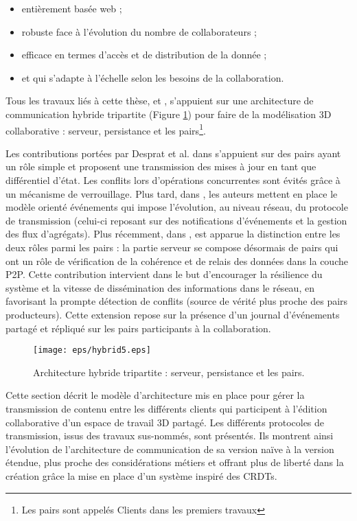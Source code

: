 \begin{itemize}
	\item entièrement basée web ; 
	\item robuste face à l'évolution du nombre de collaborateurs ; 
	\item efficace en termes d'accès et de distribution de la donnée ; 
	\item et qui s'adapte à l'échelle selon les besoins de la collaboration.
\end{itemize}


Tous les travaux liés à cette thèse, 
\cite{Desprat2015a,Desprat2015b,Desprat2016} et \cite{Desprat2017}, s'appuient sur une 
architecture de communication hybride tripartite (Figure \ref{fig:hybrid}) pour 
faire de la modélisation \gls{3D} collaborative : serveur, persistance 
et les pairs\footnote{Les pairs sont appelés \og Clients\fg{} dans les premiers 
travaux}. 

Les contributions portées par Desprat et al. dans 
\cite{Desprat2015a,Desprat2015b} 
s'appuient sur des pairs ayant un rôle simple et proposent une transmission des 
mises à jour en tant que différentiel d'état. Les conflits lors d'opérations 
concurrentes sont évités grâce à un mécanisme de verrouillage. 
Plus tard, dans \cite{Desprat2016}, les auteurs mettent en place le modèle 
orienté événements qui impose l'évolution, au niveau réseau, du protocole 
de transmission (celui-ci reposant sur 
des notifications d'événements et la gestion des flux d'agrégats). 
Plus récemment, dans \cite{Desprat2017}, est apparue la distinction entre 
les deux rôles parmi les pairs : la 
partie serveur se compose désormais de pairs qui ont un rôle de vérification 
de la cohérence et de relais des données dans la couche \gls{P2P}. Cette 
contribution intervient dans le but d'encourager la résilience du système et la 
vitesse de dissémination des informations dans le réseau, en favorisant la prompte 
détection de conflits (source de vérité plus proche des pairs producteurs). 
Cette extension repose sur la présence d'un journal d'événements partagé et 
répliqué sur les pairs participants à la collaboration.

\begin{figure}[h!]
	\centering
	\texttt{[image: eps/hybrid5.eps]}
	\caption{Architecture hybride tripartite : serveur, persistance 
		et les pairs.}
	\label{fig:hybrid}
\end{figure}

Cette section décrit le modèle d'architecture mis en 
place pour gérer la transmission de contenu entre les différents clients 
qui participent à l'édition collaborative d'un espace de travail \gls{3D} partagé. 
Les différents protocoles de transmission, issus des travaux sus-nommés, 
sont présentés. Ils montrent ainsi l'évolution de l'architecture de communication de 
sa version naïve à la version étendue, plus proche des considérations métiers et 
offrant plus de liberté dans la création grâce la mise en place d'un système inspiré 
des \glspl{CRDT}.
 
